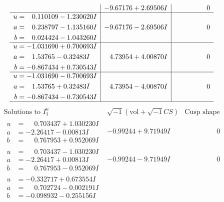 \documentclass[1p]{elsarticle_modified}
\theoremstyle{definition}
\newcommand{\I}{\sqrt{-1}}
\begin{document}
$$\begin{array}{c|c|c}
 & -9.67176 + 2.69506 I & \phantom{-0.000000 } 0 \\ \hline\begin{aligned}
u &= \phantom{-}0.110109 - 1.230620 I \\
a &= \phantom{-}0.238797 - 1.135160 I \\
b &= \phantom{-}0.024424 - 1.043260 I\end{aligned}
 & -9.67176 - 2.69506 I & \phantom{-0.000000 } 0 \\ \hline\begin{aligned}
u &= -1.031690 + 0.700693 I \\
a &= \phantom{-}1.53765 - 0.32483 I \\
b &= -0.867434 + 0.730543 I\end{aligned}
 & \phantom{-}4.73954 + 4.00870 I & \phantom{-0.000000 } 0 \\ \hline\begin{aligned}
u &= -1.031690 - 0.700693 I \\
a &= \phantom{-}1.53765 + 0.32483 I \\
b &= -0.867434 - 0.730543 I\end{aligned}
 & \phantom{-}4.73954 - 4.00870 I & \phantom{-0.000000 } 0\\
 \hline 
 \end{array}$$\newpage$$\begin{array}{c|c|c}  
\text{Solutions to }I^u_{1}& \I (\text{vol} + \sqrt{-1}CS) & \text{Cusp shape}\\
 \hline 
\begin{aligned}
u &= \phantom{-}0.703437 + 1.030230 I \\
a &= -2.26417 - 0.00813 I \\
b &= \phantom{-}0.767953 + 0.952069 I\end{aligned}
 & -0.99244 + 9.71949 I & \phantom{-0.000000 } 0 \\ \hline\begin{aligned}
u &= \phantom{-}0.703437 - 1.030230 I \\
a &= -2.26417 + 0.00813 I \\
b &= \phantom{-}0.767953 - 0.952069 I\end{aligned}
 & -0.99244 - 9.71949 I & \phantom{-0.000000 } 0 \\ \hline\begin{aligned}
u &= -0.332717 + 0.673554 I \\
a &= \phantom{-}0.702724 - 0.002191 I \\
b &= -0.098932 - 0.255156 I\end{aligned}

\end{array}$$
\end{document}
